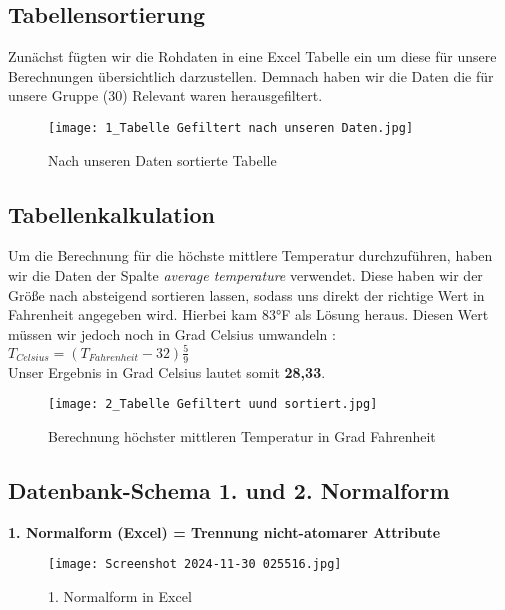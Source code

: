 \documentclass{article}
\begin{document}
\subsection{Tabellensortierung}

Zunächst fügten wir die Rohdaten in eine Excel Tabelle ein um diese für unsere Berechnungen übersichtlich darzustellen. Demnach haben wir die Daten die für unsere Gruppe (30) Relevant waren herausgefiltert.

\begin{figure}[H]
    \centering
        \label{fig: Tabelle sortiert }
    \texttt{[image: 1\_Tabelle Gefiltert nach unseren Daten.jpg]}
    \caption{Nach unseren Daten sortierte Tabelle}
\end{figure}

\subsection{Tabellenkalkulation}

Um die Berechnung für die höchste mittlere Temperatur durchzuführen, haben wir die Daten der Spalte \textit{average temperature} verwendet. Diese haben wir der Größe nach absteigend sortieren lassen, sodass uns direkt der richtige Wert in Fahrenheit angegeben wird. Hierbei kam 83°F als Lösung heraus. Diesen Wert müssen wir jedoch noch in Grad Celsius umwandeln :
\\

\newpage
\centering $T_{Celsius} = (T_{Fahrenheit}-32)\frac{5}{9}$
\\

\vspace{15pt}\centering Unser Ergebnis in Grad Celsius lautet somit \textbf{28,33}.

\begin{figure}[H]
    \centering
    \texttt{[image: 2\_Tabelle Gefiltert uund sortiert.jpg]}
    \caption{Berechnung höchster mittleren Temperatur in Grad Fahrenheit}
    \label{fig:enter-label}
\end{figure}


\raggedright
\subsection{Datenbank-Schema 1. und 2. Normalform}

\vspace{15pt}
\textbf{1. Normalform (Excel) = Trennung nicht-atomarer Attribute}
\begin{figure}[H]
    \centering
    \texttt{[image: Screenshot 2024-11-30 025516.jpg]}
    \caption{1. Normalform in Excel}
    \label{fig:enter-label}
\end{figure}
\end{document}
